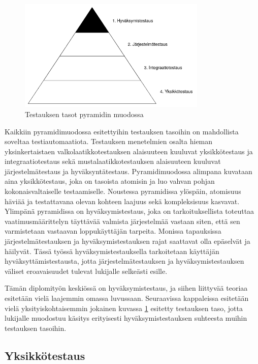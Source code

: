   \begin{figure}[H]
    \centering
    \includegraphics[width=0.8\textwidth]{assets/testauksen-tasot.png}
    \caption{Testauksen tasot pyramidin muodossa}
    \label{fig:testing-levels-pyramid}
  \end{figure}

  Kaikkiin pyramidimuodossa esitettyihin testauksen tasoihin on mahdollista soveltaa testiautomaatiota.
  Testauksen menetelmien osalta hieman yksinkertaistaen valkolaatikkotestauksen alaisuuteen kuuluvat yksikkötestaus ja integraatiotestaus sekä mustalaatikkotestauksen alaisuuteen kuuluvat järjestelmätestaus ja hyväksyntätestaus.
  Pyramidimuodossa alimpana kuvataan aina yksikkötestaus, joka on tasoista atomisin ja luo vahvan pohjan kokonaisvaltaiselle testaamiselle.
  Noustessa pyramidissa ylöspäin, atomisuus häviää ja testattavana olevan kohteen laajuus sekä kompleksisuus kasvavat.
  Ylimpänä pyramidissa on hyväksymistestaus, joka on tarkoituksellista toteuttaa vaatimusmäärittelyn täyttävää valmista järjestelmää vastaan siten, että sen varmistetaan vastaavan loppukäyttäjän tarpeita.
  Monissa tapauksissa järjestelmätestauksen ja hyväksymistestauksen rajat saattavat olla epäselvät ja häilyvät.
  Tässä työssä hyväksymistestauksella tarkoitetaan käyttäjän hyväksyttämistestausta, jotta järjestelmätestauksen ja hyväksymistestauksen väliset eroavaisuudet tulevat lukijalle selkeästi esille.

  Tämän diplomityön keskiössä on hyväksymistestaus, ja siihen liittyvää teoriaa esitetään vielä laajemmin omassa luvussaan.
  Seuraavissa kappaleissa esitetään vielä yksityiskohtaisemmin jokainen kuvassa \ref{fig:testing-levels-pyramid} esitetty testauksen taso, jotta lukijalle muodostuu käsitys erityisesti hyväksymistestauksen suhteesta muihin testauksen tasoihin.

  \subsection{Yksikkötestaus} \label{ch:07_yksikkotestaus}

